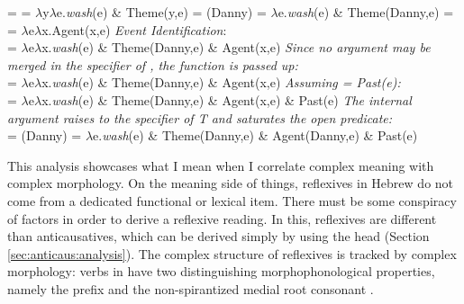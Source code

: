 \xe


\pex\label{sem:thit-refl}
\a {} =  = $\lambda$y$\lambda$e.\emph{wash}(e) \& Theme(y,e)
\a {} = (Danny) = $\lambda$e.\emph{wash}(e) \& Theme(Danny,e)
\a \denote{\vz} = \denote{\vz+\va~\!} = $\lambda$e$\lambda$x.Agent(x,e)
\a \emph{Event Identification}:\\
	 = $\lambda$e$\lambda$x.\emph{wash}(e) \& Theme(Danny,e) \& Agent(x,e)
\a\label{ex:thit-refl-ident}\emph{Since no argument may be merged in the specifier of \vz, the function is passed up:}\\
 = $\lambda$e$\lambda$x.\emph{wash}(e) \& Theme(Danny,e) \& Agent(x,e)
\a \emph{Assuming \emph{} = Past(e):}\\
 = $\lambda$e$\lambda$x.\emph{\emph{wash}}(e) \& Theme(Danny,e) \& Agent(x,e) \& Past(e)
\a\label{ex:thit-refl-raise}\emph{The internal argument raises to the specifier of T and saturates the open predicate:}\\
 = (Danny) = $\lambda$e.\emph{wash}(e) \& Theme(Danny,e) \& Agent(Danny,e) \& Past(e)
\xe

This analysis showcases what I mean when I correlate complex meaning with complex morphology. On the meaning side of things, reflexives in Hebrew do not come from a dedicated functional or lexical item. There must be some conspiracy of factors in order to derive a reflexive reading. In this, reflexives are different than anticausatives, which can be derived simply by using the head {\vz} (Section \ref{sec:anticaus:analysis}). The complex structure of reflexives is tracked by complex morphology: verbs in {\thit} have two distinguishing morphophonological properties, namely the prefix and the non-spirantized medial root consonant .

